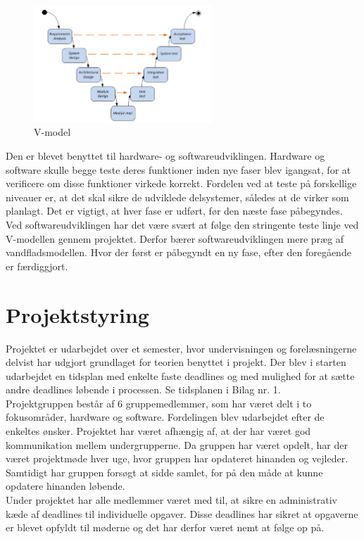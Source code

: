 \begin{figure}[H]
	\centering
	\includegraphics[width=0.6\textwidth]{Figurer/VModellen}
	\caption{V-model}
	\label{fig:V_Modellen}
\end{figure}

Den er blevet benyttet til hardware- og softwareudviklingen. Hardware og software skulle begge teste deres funktioner inden nye faser blev igangsat, for at verificere om disse funktioner virkede korrekt. Fordelen ved at teste på forskellige niveauer er, at det skal sikre de udviklede delsystemer, således at de virker som planlagt. Det er vigtigt, at hver fase er udført, før den næste fase påbegyndes. 
\\
Ved softwareudviklingen har det være svært at følge den stringente teste linje ved V-modellen gennem projektet. Derfor bærer softwareudviklingen mere præg af vandfladsmodellen. Hvor der først er påbegyndt en ny fase, efter den foregående er færdiggjort.  

\section{Projektstyring}
Projektet er udarbejdet over et semester, hvor undervisningen og forelæsningerne delvist har udgjort grundlaget for teorien benyttet i projekt. Der blev i starten udarbejdet en tidsplan med enkelte faste deadlines og med mulighed for at sætte andre deadlines løbende i processen. Se tidsplanen i Bilag nr. 1.\\ 
Projektgruppen består af 6 gruppemedlemmer, som har været delt i to fokusområder, hardware og software. Fordelingen blev udarbejdet efter de enkeltes ønsker. Projektet har været afhængig af, at der har været god kommunikation mellem undergrupperne.
Da gruppen har været opdelt, har der været projektmøde hver uge, hvor gruppen har opdateret hinanden og vejleder. Samtidigt har gruppen forsøgt at sidde samlet, for på den måde at kunne opdatere hinanden løbende.\\
Under projektet har alle medlemmer været med til, at sikre en administrativ kæde af deadlines til individuelle opgaver. Disse deadlines har sikret at opgaverne er blevet opfyldt til møderne og det har derfor været nemt at følge op på.  
\newpage
